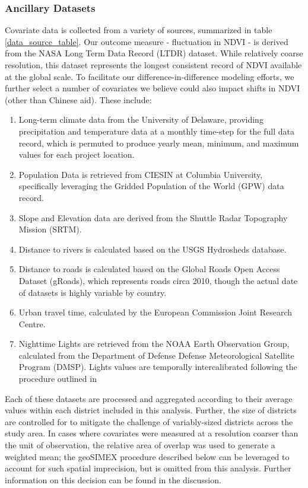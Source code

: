 \documentclass[11pt]{article}
\begin{document}
\subsubsection{Ancillary Datasets}
Covariate data is collected from a variety of sources, summarized in table \ref{data_source_table}.
Our outcome measure - fluctuation in NDVI - is derived from the NASA Long Term Data Record (LTDR) dataset.
While relatively coarse resolution, this dataset represents the longest consistent record of NDVI available at the global scale.
To facilitate our difference-in-difference modeling efforts, we further select a number of covariates we believe could also impact shifts in NDVI (other than Chinese aid).
These include:
\begin{enumerate}
\item{Long-term climate data from the University of Delaware, providing precipitation and temperature data at a monthly time-step for the full data record, which is permuted to produce yearly mean, minimum, and maximum values for each project location.}
\item{Population Data is retrieved from CIESIN at Columbia University, specifically leveraging the Gridded Population of the World (GPW) data record.}
\item{Slope and Elevation data are derived from the Shuttle Radar Topography Mission (SRTM).}
\item{Distance to rivers is calculated based on the USGS Hydrosheds database.}
\item{Distance to roads is calculated based on the Global Roads Open Access Dataset (gRoads), which represents roads circa 2010, though the actual date of datasets is highly variable by country.}
\item{Urban travel time, calculated by the European Commission Joint Research Centre.}
\item{Nighttime Lights are retrieved from the NOAA Earth Observation Group, calculated from the Department of Defense Defense Meteorological Satellite Program (DMSP).  Lights values are temporally intercalibrated following the procedure outlined in \cite{weng_global_2014}}
\end{enumerate}
Each of these datasets are processed and aggregated according to their average values within each district included in this analysis.  
Further, the size of districts are controlled for to mitigate the challenge of variably-sized districts across the study area.
In cases where covariates were measured at a resolution coarser than the unit of observation, the relative area of overlap was used to generate a weighted mean; the geoSIMEX procedure described below can be leveraged to account for such spatial imprecision, but is omitted from this analysis.
Further information on this decision can be found in the discussion.
\end{document}

